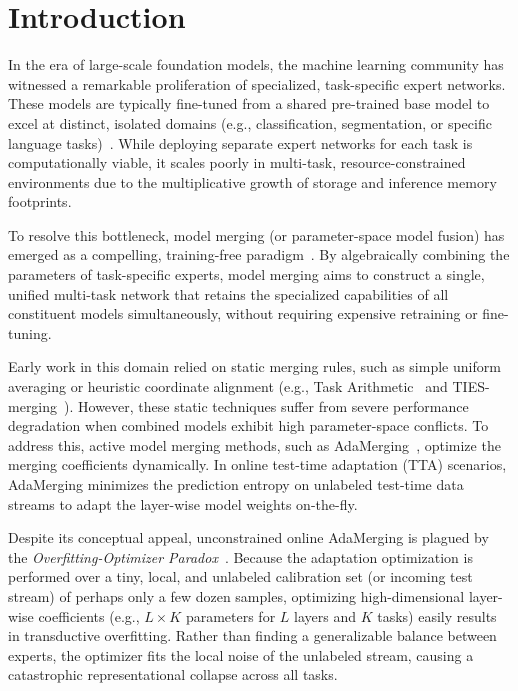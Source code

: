\section{Introduction}
\label{sec:intro}

In the era of large-scale foundation models, the machine learning community has witnessed a remarkable proliferation of specialized, task-specific expert networks. These models are typically fine-tuned from a shared pre-trained base model to excel at distinct, isolated domains (e.g., classification, segmentation, or specific language tasks)~\cite{ilharco2022editing, wortsman2022model}. While deploying separate expert networks for each task is computationally viable, it scales poorly in multi-task, resource-constrained environments due to the multiplicative growth of storage and inference memory footprints. 

To resolve this bottleneck, model merging (or parameter-space model fusion) has emerged as a compelling, training-free paradigm~\cite{yadav2023ties, matena2021merging}. By algebraically combining the parameters of task-specific experts, model merging aims to construct a single, unified multi-task network that retains the specialized capabilities of all constituent models simultaneously, without requiring expensive retraining or fine-tuning.

Early work in this domain relied on static merging rules, such as simple uniform averaging or heuristic coordinate alignment (e.g., Task Arithmetic~\cite{ilharco2022editing} and TIES-merging~\cite{yadav2023ties}). However, these static techniques suffer from severe performance degradation when combined models exhibit high parameter-space conflicts. To address this, active model merging methods, such as AdaMerging~\cite{adamerging}, optimize the merging coefficients dynamically. In online test-time adaptation (TTA) scenarios, AdaMerging minimizes the prediction entropy on unlabeled test-time data streams to adapt the layer-wise model weights on-the-fly.

Despite its conceptual appeal, unconstrained online AdaMerging is plagued by the \emph{Overfitting-Optimizer Paradox}~\cite{regcalmerge, polymerge}. Because the adaptation optimization is performed over a tiny, local, and unlabeled calibration set (or incoming test stream) of perhaps only a few dozen samples, optimizing high-dimensional layer-wise coefficients (e.g., $L \times K$ parameters for $L$ layers and $K$ tasks) easily results in transductive overfitting. Rather than finding a generalizable balance between experts, the optimizer fits the local noise of the unlabeled stream, causing a catastrophic representational collapse across all tasks.


